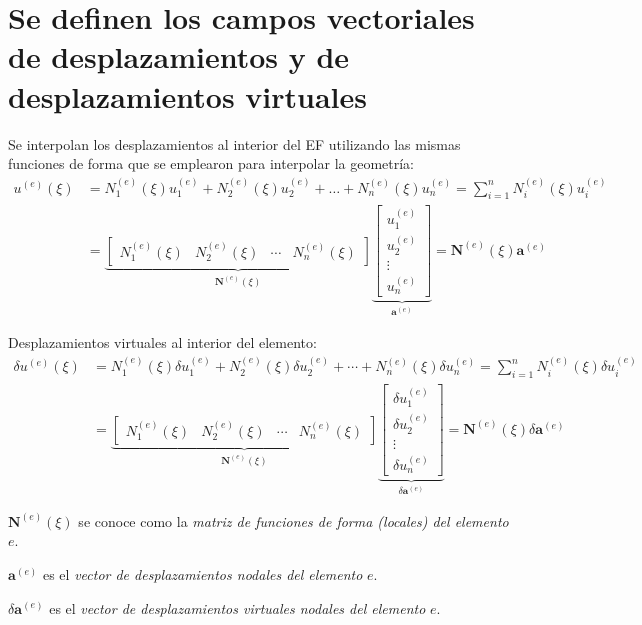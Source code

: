 \documentclass[12pt,letterpaper]{article}
\newcommand{\ve}[1]{{\boldsymbol{#1}}}
\newcommand{\ma}[1]{{\boldsymbol{#1}}}
\begin{document}
\section{Se definen los campos vectoriales de desplazamientos y  de desplazamientos virtuales}
Se interpolan los desplazamientos al interior del EF utilizando las mismas funciones de forma que se emplearon para interpolar la geometría:
\begin{align}
u^{(e)}(\xi) 
&= N_1^{(e)}(\xi) u_1^{(e)} + N_2^{(e)}(\xi) u_2^{(e)} + \ldots + N_n^{(e)}(\xi) u_n^{(e)} 
= \sum_{i=1}^n N_i^{(e)}(\xi) u_i^{(e)} \\
&= 
\underbrace{\begin{bmatrix}
N_1^{(e)}(\xi) & N_2^{(e)}(\xi) & \cdots & N_n^{(e)}(\xi)
\end{bmatrix}}_{\ma{N}^{(e)}(\xi)}
\underbrace{\begin{bmatrix}
   u_1^{(e)} \\ u_2^{(e)} \\ \vdots \\ u_n^{(e)}
   \end{bmatrix}}_{\ma{a}^{(e)}} = \ma{N}^{(e)}(\xi)  \ve{a}^{(e)}
\end{align}

Desplazamientos virtuales al interior del elemento:
\begin{align}
\delta u^{(e)}(\xi) 
&= N_1^{(e)}(\xi) \delta u_1^{(e)} + N_2^{(e)}(\xi) \delta u_2^{(e)} + \cdots + N_n^{(e)}(\xi) \delta u_n^{(e)} = \sum_{i=1}^n N_i^{(e)}(\xi) \delta u_i^{(e)} \\
&= 
\underbrace{\begin{bmatrix}
   N_1^{(e)}(\xi) & N_2^{(e)}(\xi) & \cdots & N_n^{(e)}(\xi)
   \end{bmatrix}}_{\ma{N}^{(e)}(\xi)}
\underbrace{\begin{bmatrix}
   \delta u_1^{(e)} \\ \delta u_2^{(e)} \\ \vdots \\ \delta u_n^{(e)} 
   \end{bmatrix}}_{\delta \ma{a}^{(e)}} = \ma{N}^{(e)}(\xi) \delta \ve{a}^{(e)}
\end{align}

$\ma{N}^{(e)}(\xi)$ se conoce como la \emph{matriz de funciones de forma (locales) del elemento} $e$.

$\ve{a}^{(e)}$ es el \emph{vector de desplazamientos nodales del elemento} $e$.

$\delta\ve{a}^{(e)}$ es el \emph{vector de desplazamientos virtuales nodales del elemento} $e$.
\end{document}
